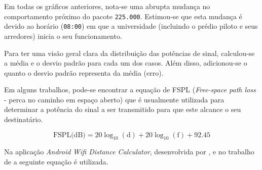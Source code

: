 Em todas os gráficos anteriores, nota-se uma abrupta mudança no comportamento
próximo do pacote \texttt{225.000}.
Estimou-se que esta mudança é devido ao horário (\texttt{08:00}) em que a universidade
(incluindo o prédio piloto e seus arredores) inicia o seu funcionamento.

Para ter uma visão geral clara da distribuição das potências de sinal, calculou-se
a média e o desvio padrão para cada um dos casos. Além disso, adicionou-se o
quanto o desvio padrão representa da média (erro).

\begin{table}[htb]
\end{table}


Em alguns trabalhos, pode-se
encontrar a equação de FSPL (\emph{Free-space path loss} - perca no caminho em
espaço aberto) que é usualmente utilizada para determinar a potência do sinal
a ser transmitido para que este alcance o seu destinatário.

\begin{equation}
	{\mbox{FSPL(dB)}}=20\log _{{10}}(\text{d})+20\log _{{10}}(\text{f})+92.45
\end{equation}

Na aplicação \emph{Android} \emph{Wifi Distance Calculator}, desenvolvida por
, e no trabalho de  a seguinte
equação é utilizada.

